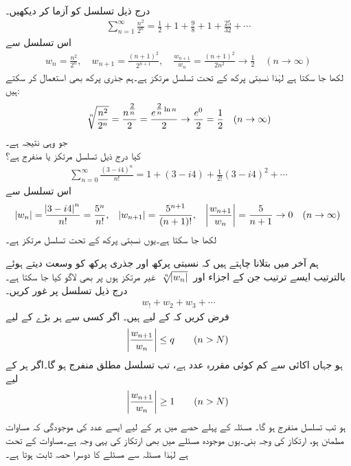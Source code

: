 \quad {}\\
درج ذیل تسلسل کو آزما کر دیکھیں۔
\begin{align*}
\sum_{n=1}^{\infty} \frac{n^2}{2^n}=\frac{1}{2}+1+\frac{9}{8}+1+\frac{25}{32}+\cdots
\end{align*}
اس تسلسل سے 
\begin{align*}
w_n=\frac{n^2}{2^n}, \quad w_{n+1}=\frac{(n+1)^2}{2^{n+1}},\quad \frac{w_{n+1}}{w_n}=\frac{(n+1)^2}{2n^2}\to \frac{1}{2}\quad (n\to\infty)
\end{align*}
لکھا جا سکتا ہے لہٰذا نسبتی پرکھ کے تحت تسلسل مرتکز ہے۔ہم جذری پرکھ بھی استعمال کر سکتے ہیں:
\begin{align*}
\sqrt[\leftroot{-2}n]{\frac{n^2}{2^n}}=\frac{n^{\tfrac{2}{n}}}{2}=\frac{e^{\tfrac{2}{n}\ln n}}{2}\to \frac{e^0}{2}=\frac{1}{2}\quad (n\to\infty)
\end{align*}
جو وہی نتیجہ ہے۔ 
\quad {}\\
کیا درج ذیل تسلسل مرتکز یا منفرج ہے؟
\begin{align*}
\sum_{n=0}^{\infty}\frac{(3-i4)^n}{n!}=1+(3-i4)+\frac{1}{2!}(3-i4)^2+\cdots
\end{align*}
اس تسلسل سے 
\begin{align*}
\abs{w_n}=\frac{\abs{3-i4}^n}{n!}=\frac{5^n}{n!}, \quad \abs{w_{n+1}}=\frac{5^{n+1}}{(n+1)!},\quad \abs{\frac{w_{n+1}}{w_n}}=\frac{5}{n+1}\to 0 \quad (n\to \infty)
\end{align*}
لکھا جا سکتا ہے۔یوں نسبتی پرکھ کے تحت تسلسل مرتکز ہے۔

ہم آخر میں بتلانا چاہتے ہیں کہ نسبتی پرکھ اور جذری پرکھ کو وسعت دیتے ہوئے بالترتیب  ایسے ترتیب جن کے اجزاء  اور 
$\,\sqrt[\leftroot{-2}n]{\abs{w_n}}\,$
غیر مرتکز ہوں پر بھی لاگو کیا جا سکتا ہے۔
\quad {}\\
درج ذیل تسلسل پر غور کریں۔
\begin{align*}
w_!+w_2+w_3+\cdots
\end{align*}
فرض کریں کہ  کے لیے  ہیں۔ اگر کسی  سے ہر بڑے  کے لیے
\begin{align}\label{مساوات_ترتیب_تناسبی_الف}
\abs{\frac{w_{n+1}}{w_n}}\le q\quad \quad (n>N)
\end{align}
ہو جہاں  اکائی سے کم کوئی مقررہ عدد ہے، تب تسلسل مطلق منفرج ہو گا۔اگر ہر  کے لیے 
\begin{align}\label{مساوات_ترتیب_تناسبی_ب}
\abs{\frac{w_{n+1}}{w_n}}\ge 1\quad \quad (n>N)
\end{align}
ہو تب تسلسل منفرج ہو گا۔
\quad
مسئلہ  کے پہلے حصے میں ہر  کے لیے ایسے عدد  کی موجودگی  کہ مساوات  مطمئن ہو، ارتکاز کی وجہ بنی۔یوں موجودہ مسئلے میں بھی ارتکاز کی یہی وجہ ہے۔مساوات  کے تحت  ہے لہٰذا   مسئلہ سے مسئلے کا دوسرا حصہ ثابت ہوتا ہے۔

